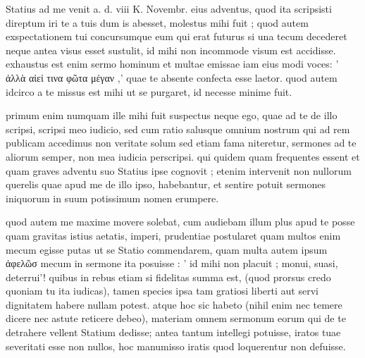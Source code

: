 


 Statius ad me venit a. d. viii K. Novembr. eius adventus, quod ita scripsisti direptum iri te a tuis dum is abesset, molestus mihi fuit ; quod autem exspectationem tui concursumque eum qui erat futurus si una tecum decederet neque antea visus esset sustulit, id mihi non incommode visum est accidisse. exhaustus est enim sermo hominum et multae emissae iam eius modi voces: ' ἀλλὰ αἰεί τινα φῶτα μέγαν ,' quae te absente confecta esse laetor. quod autem idcirco a te missus est mihi ut se purgaret, id necesse minime fuit.

 primum enim numquam ille mihi fuit suspectus neque ego, quae ad te de illo scripsi, scripsi meo iudicio, sed cum ratio salusque omnium nostrum qui ad rem publicam accedimus non veritate solum sed etiam fama niteretur, sermones ad te aliorum semper, non mea iudicia perscripsi. qui quidem quam frequentes essent et quam graves adventu suo Statius ipse cognovit ; etenim intervenit non nullorum querelis quae apud me de illo ipso, habebantur, et sentire potuit sermones iniquorum in suum potissimum nomen erumpere.

 quod autem me maxime movere solebat, cum audiebam illum plus apud te posse quam gravitas istius aetatis, imperi, prudentiae postularet quam multos enim mecum egisse putas ut se Statio commendarem, quam multa autem ipsum ἀφελῶσ mecum in sermone ita posuisse : ' id mihi non placuit ; monui, suasi, deterrui'! quibus in rebus etiam si fidelitas summa est, (quod prorsus credo quoniam tu ita iudicas), tamen species ipsa tam gratiosi liberti aut servi dignitatem habere nullam potest. atque hoc sic habeto (nihil enim nec temere dicere nec astute reticere debeo), materiam omnem sermonum eorum qui de te detrahere vellent Statium dedisse; antea tantum intellegi potuisse, iratos tuae severitati esse non nullos, hoc manumisso iratis quod loquerentur non defuisse.

